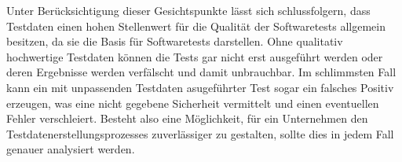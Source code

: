 Unter Berücksichtigung dieser Gesichtspunkte lässt sich schlussfolgern, dass Testdaten einen hohen Stellenwert für die Qualität der Softwaretests allgemein besitzen, da sie die Basis für Softwaretests darstellen. Ohne qualitativ hochwertige Testdaten können die Tests gar nicht erst ausgeführt werden oder deren Ergebnisse werden verfälscht und damit unbrauchbar. Im schlimmsten Fall kann ein mit unpassenden Testdaten asugeführter Test sogar ein falsches Positiv erzeugen, was eine nicht gegebene Sicherheit vermittelt und einen eventuellen Fehler verschleiert. Besteht also eine Möglichkeit, für ein Unternehmen den Testdatenerstellungsprozesses zuverlässiger zu gestalten, sollte dies in jedem Fall genauer analysiert werden.